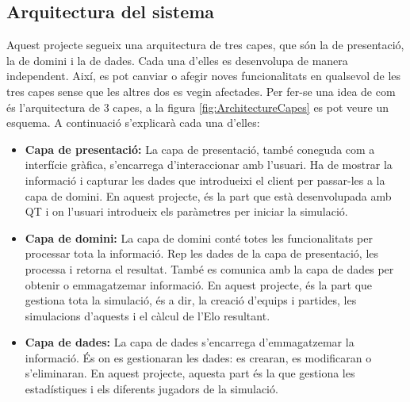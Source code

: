 \documentclass[a4paper]{article}
\begin{document}
\subsection{Arquitectura del sistema}
Aquest projecte segueix una arquitectura de tres capes, que són la de presentació, la de domini i la de dades. Cada una d'elles es desenvolupa de manera independent. Així, es pot canviar o afegir noves funcionalitats en qualsevol de les tres capes sense que les altres dos es vegin afectades. Per fer-se una idea de com és l'arquitectura de 3 capes, a la figura \ref{fig:ArchitectureCapes} es pot veure un esquema. A continuació s'explicarà cada una d'elles:

\begin{itemize}
    \item \textbf{Capa de presentació:} La capa de presentació, també coneguda com a interfície gràfica, s'encarrega d'interaccionar amb l'usuari. Ha de mostrar la informació i capturar les dades que introdueixi el client per passar-les a la capa de domini. En aquest projecte, és la part que està desenvolupada amb QT i on l'usuari introdueix els paràmetres per iniciar la simulació.
    
    \item \textbf{Capa de domini:} La capa de domini conté totes les funcionalitats per processar tota la informació. Rep les dades de la capa de presentació, les processa i retorna el resultat. També es comunica amb la capa de dades per obtenir o emmagatzemar informació. En aquest projecte, és la part que gestiona tota la simulació, és a dir, la creació d'equips i partides, les simulacions d'aquests i el càlcul de l'Elo resultant.
    
    \item \textbf{Capa de dades:} La capa de dades s'encarrega d'emmagatzemar la informació. És on es gestionaran les dades: es crearan, es modificaran o s'eliminaran. En aquest projecte, aquesta part és la que gestiona 
    les estadístiques i els diferents jugadors de la simulació.
\end{itemize}
\end{document}
